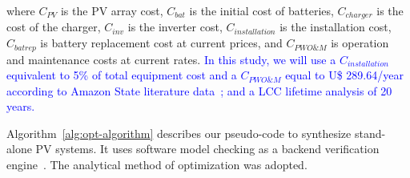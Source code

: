 \documentclass[runningheads]{llncs}
\begin{document}
\noindent where $C_{PV}$ is the PV array cost, $C_{bat}$ is the initial cost of batteries, $C_{charger}$ is the cost of the charger, $C_{inv}$ is the inverter cost, $C_{installation}$ is the installation cost, $C_{batrep}$ is battery replacement cost at current prices, and $C_{PWO\&M}$ is operation and maintenance costs at current rates. \textcolor{blue}{In this study, we will use a $C_{installation}$ equivalent to 5\% of total equipment cost and a $C_{PWO\&M}$ equal to U\$ 289.64/year according to Amazon State literature data~\cite{Agrener2013}; and a LCC lifetime analysis of 20 years.}

Algorithm~\ref{alg:opt-algorithm} describes our pseudo-code to synthesize stand-alone PV systems. It uses software model checking as a backend verification engine~\cite{DBLP:journals/corr/abs-1909-13139}. The analytical method of optimization was adopted.
\end{document}
